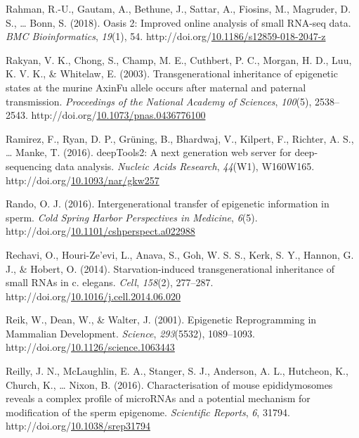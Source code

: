 \documentclass[12pt,twoside]{reedthesis}
\newlength{\cslhangindent}
\newenvironment{CSLReferences}[2] %
 {%
  \setlength{\parindent}{0pt}
  \ifodd #1 \everypar{\setlength{\hangindent}{\cslhangindent}}\ignorespaces\fi
  \ifnum #2 > 0
  \setlength{\parskip}{#2\baselineskip}
  \fi
 }%
 {}
\begin{document}
\begin{CSLReferences}{1}{0}
\leavevmode{}%
Rahman, R.-U., Gautam, A., Bethune, J., Sattar, A., Fiosins, M., Magruder, D. S., \ldots{} Bonn, S. (2018). Oasis 2: Improved online analysis of small RNA-seq data. \emph{BMC Bioinformatics}, \emph{19}(1), 54. http://doi.org/\href{https://doi.org/10.1186/s12859-018-2047-z}{10.1186/s12859-018-2047-z}

\leavevmode{}%
Rakyan, V. K., Chong, S., Champ, M. E., Cuthbert, P. C., Morgan, H. D., Luu, K. V. K., \& Whitelaw, E. (2003). Transgenerational inheritance of epigenetic states at the murine AxinFu allele occurs after maternal and paternal transmission. \emph{Proceedings of the National Academy of Sciences}, \emph{100}(5), 2538--2543. http://doi.org/\href{https://doi.org/10.1073/pnas.0436776100}{10.1073/pnas.0436776100}

\leavevmode{}%
Ramirez, F., Ryan, D. P., Grüning, B., Bhardwaj, V., Kilpert, F., Richter, A. S., \ldots{} Manke, T. (2016). deepTools2: A next generation web server for deep-sequencing data analysis. \emph{Nucleic Acids Research}, \emph{44}(W1), W160W165. http://doi.org/\href{https://doi.org/10.1093/nar/gkw257}{10.1093/nar/gkw257}

\leavevmode{}%
Rando, O. J. (2016). Intergenerational transfer of epigenetic information in sperm. \emph{Cold Spring Harbor Perspectives in Medicine}, \emph{6}(5). http://doi.org/\href{https://doi.org/10.1101/cshperspect.a022988}{10.1101/cshperspect.a022988}

\leavevmode{}%
Rechavi, O., Houri-Ze'evi, L., Anava, S., Goh, W. S. S., Kerk, S. Y., Hannon, G. J., \& Hobert, O. (2014). Starvation-induced transgenerational inheritance of small RNAs in c. elegans. \emph{Cell}, \emph{158}(2), 277--287. http://doi.org/\href{https://doi.org/10.1016/j.cell.2014.06.020}{10.1016/j.cell.2014.06.020}

\leavevmode{}%
Reik, W., Dean, W., \& Walter, J. (2001). Epigenetic Reprogramming in Mammalian Development. \emph{Science}, \emph{293}(5532), 1089--1093. http://doi.org/\href{https://doi.org/10.1126/science.1063443}{10.1126/science.1063443}

\leavevmode{}%
Reilly, J. N., McLaughlin, E. A., Stanger, S. J., Anderson, A. L., Hutcheon, K., Church, K., \ldots{} Nixon, B. (2016). Characterisation of mouse epididymosomes reveals a complex profile of {microRNAs} and a potential mechanism for modification of the sperm epigenome. \emph{Scientific Reports}, \emph{6}, 31794. http://doi.org/\href{https://doi.org/10.1038/srep31794}{10.1038/srep31794}


\end{CSLReferences}
\end{document}
